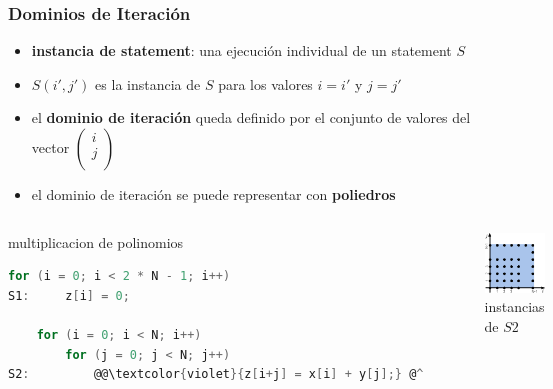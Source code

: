 \documentclass{beamer}\usetheme{Madrid} %
\begin{document}
\begin{frame}[fragile]
\frametitle{Dominios de Iteración}
\begin{itemize}
\item \textbf{instancia de statement}: una ejecución individual de un statement $S$ 
\item $S(i',j')$ es la instancia de $S$ para los valores $i=i'$ y $j=j'$ 
\item el \textbf{dominio de iteración} queda definido por el conjunto de valores
del vector $\left(\begin{smallmatrix}i\\j\\\end{smallmatrix}\right)$
\item el dominio de iteración se puede representar con \textbf{poliedros} 
\end{itemize}
\begin{columns}
\begin{block}{multiplicacion de polinomios}
\begin{lstlisting}[basicstyle=\scriptsize,language=C]
    for (i = 0; i < 2 * N - 1; i++) 
S1:     z[i] = 0;
        
    for (i = 0; i < N; i++) 
        for (j = 0; j < N; j++)
S2:         @@\textcolor{violet}{z[i+j] = x[i] + y[j];} @^
\end{lstlisting}
\end{block}
\begin{figure}
\includegraphics[scale=0.4]{img/poly_mul_solo.png}
\caption{instancias de $S2$}
\end{figure}
\end{columns}
\end{frame}
\end{document}
